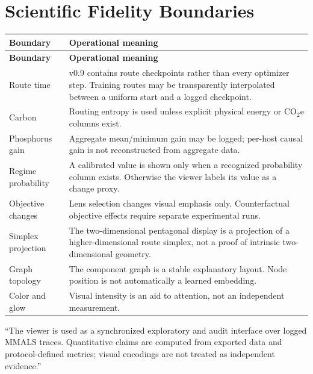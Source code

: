 \documentclass[11pt,a4paper]{article}
\begin{document}
\section{Scientific Fidelity Boundaries}

\begin{longtable}{@{}P{36mm}P{127mm}@{}}
\toprule
\textbf{Boundary} & \textbf{Operational meaning}\\
\midrule
\endfirsthead
\toprule
\textbf{Boundary} & \textbf{Operational meaning}\\
\midrule
\endhead
Route time & v0.9 contains route checkpoints rather than every optimizer step. Training routes may be transparently interpolated between a uniform start and a logged checkpoint.\\
Carbon & Routing entropy is used unless explicit physical energy or CO$_2$e columns exist.\\
Phosphorus gain & Aggregate mean/minimum gain may be logged; per-host causal gain is not reconstructed from aggregate data.\\
Regime probability & A calibrated value is shown only when a recognized probability column exists. Otherwise the viewer labels its value as a change proxy.\\
Objective changes & Lens selection changes visual emphasis only. Counterfactual objective effects require separate experimental runs.\\
Simplex projection & The two-dimensional pentagonal display is a projection of a higher-dimensional route simplex, not a proof of intrinsic two-dimensional geometry.\\
Graph topology & The component graph is a stable explanatory layout. Node position is not automatically a learned embedding.\\
Color and glow & Visual intensity is an aid to attention, not an independent measurement.\\
\bottomrule
\end{longtable}

\begin{sciencebox}
``The viewer is used as a synchronized exploratory and audit interface over logged MMALS traces. Quantitative claims are computed from exported data and protocol-defined metrics; visual encodings are not treated as independent evidence.''
\end{sciencebox}
\end{document}
